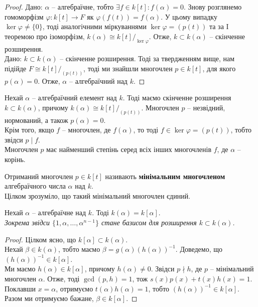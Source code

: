\documentclass{math_library}
\begin{document}
\begin{proof}
\rightproof Дано: $\alpha$ -- алгебраїчне, тобто $\exists f \in k[t]: f(\alpha) = 0$. Знову розглянемо гомоморфізм $\varphi \colon k[t] \to F$ як $\varphi(f(t))  = f(\alpha)$. У цьому випадку $\ker \varphi \neq \{0\}$, тоді аналогічними міркуваннями $\ker \varphi = (p(t))$ та за I теоремою про ізоморфізм, $k(\alpha) \cong k[t]/_{\ker \varphi}$. Отже, $k \subset k(\alpha)$ -- скінченне розширення.
\bigskip \\
\leftproof Дано: $k \subset k(\alpha)$ -- скінченне розширення. Тоді за твердженням вище, нам підійде $F \cong k[t]/_{(p(t))}$, тоді ми знайшли многочлен $p \in k[t]$, для якого $p(\alpha) = 0$. Отже, $\alpha$ -- алгебраїчний над $k$.
\end{proof}

Нехай $\alpha$ -- алгебраїчний елемент над $k$. Тоді маємо скінченне розширення $k \subset k(\alpha)$, причому $k(\alpha) \cong k[t]/_{(p(t))}$. Многочлен $p$ -- незвідний, нормований, а також $p(\alpha) = 0$.\\
Крім того, якщо $f$ -- многочлен, де $f(\alpha)$, то тоді $f \in \ker \varphi = (p(t))$, тобто звідси $p \mid f$.\\
Многочлен $p$ має найменший степінь серед всіх інших многочленів $f$, де $\alpha$ -- корінь.

\begin{definition}
Отриманий многочлен $p \in k[t]$ називають \textbf{мінімальним многочленом} алгебраїчного числа $\alpha$ над $k$.
\bigskip \\
Цілком зрозуміло, що такий мінімальний многочлен єдиний.
\end{definition} 

\begin{proposition}
Нехай $\alpha$ -- алгебраїчне над $k$. Тоді $k(\alpha) = k[\alpha]$.\\
\textit{Зокрема звідси $\{1,\alpha,\dots,\alpha^{n-1}\}$ стане базисом для розширення $k \subset k(\alpha)$.}
\end{proposition}

\begin{proof}
Цілком ясно, що $k[\alpha] \subset k(\alpha)$.\\
Нехай $\beta \in k(\alpha)$, тобто маємо $\beta = g(\alpha) (h(\alpha))^{-1}$. Доведемо, що $(h(\alpha))^{-1} \in k[\alpha]$.\\
Ми маємо $h(\alpha) \in k[\alpha]$, причому $h(\alpha) \neq 0$. Звідси $p \nmid h$, де $p$ -- мінімальний многочлен $\alpha$. Отже, тоді $\gcd(p,h) = 1$, тож $s(x)p(x) + t(x)h(x) = 1$. Поклавши $x = \alpha$, отримуємо $t(\alpha)h(\alpha) = 1$, тобто $(h(\alpha))^{-1} \in k[\alpha]$.\\
Разом ми отримуємо бажане, $\beta \in k[\alpha]$.
\end{proof}
\end{document}
